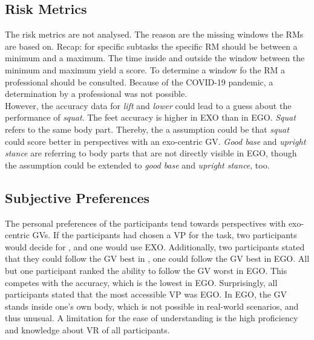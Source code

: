 \subsection{Risk Metrics}
The risk metrics are not analysed. The reason are the missing windows the RMs are based on. Recap: for specific subtasks the specific RM should be between a minimum and a maximum. The time inside and outside the window between the minimum and maximum yield a score. To determine a window fo the RM a professional should be consulted. Because of the COVID-19 pandemic, a determination by a professional was not possible.\\
However, the accuracy data for \textit{lift} and \textit{lower} could lead to a guess about the performance of \textit{squat}. The feet accuracy is higher in EXO than in EGO. \textit{Squat} refers to the same body part. Thereby, the a assumption could be that \textit{squat} could score better in perspectives with an exo-centric GV. \textit{Good base} and \textit{upright stance} are referring to body parts that are not directly visible in EGO, though the assumption could be extended to \textit{good base} and \textit{upright stance}, too.

\subsection{Subjective Preferences}
The personal preferences of the participants tend towards perspectives with exo-centric GVs. If the participants had chosen a VP for the task, two participants would decide for \combi, and one would use EXO. Additionally, two participants stated that they could follow the GV best in \combi, one could follow the GV best in EGO. All but one participant ranked the ability to follow the GV worst in EGO. This competes with the accuracy, which is the lowest in EGO. Surprisingly, all participants stated that the most accessible VP was EGO. In EGO, the GV stands inside one's own body, which is not possible in real-world scenarios, and thus unusual. A limitation for the ease of understanding is the high proficiency and knowledge about VR of all participants.
